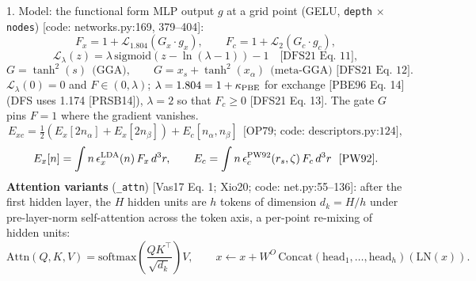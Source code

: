 
\begin{frame}{1. Model: the functional form}
  \small
  MLP output $g$ at a grid point (GELU, \texttt{depth} $\times$ \texttt{nodes}) [code: networks.py:169, 379--404]:
  \[
  F_x = 1 + \mathcal{L}_{1.804}\!\left(G_x \cdot g_x\right), \qquad
  F_c = 1 + \mathcal{L}_{2}\!\left(G_c \cdot g_c\right),
  \]
  \[
  \mathcal{L}_{\lambda}(z) = \lambda\,\mathrm{sigmoid}\!\left(z - \ln(\lambda - 1)\right) - 1 \quad \text{[DFS21 Eq. 11]},
  \]
  \[
  G = \tanh^2(s) \ \ \text{(GGA)}, \qquad G = x_s + \tanh^2(x_\alpha) \ \ \text{(meta-GGA) [DFS21 Eq. 12]}.
  \]
  $\mathcal{L}_\lambda(0) = 0$ and $F \in (0, \lambda)$; $\lambda = 1.804 = 1 + \kappa_{\rm PBE}$ for exchange [PBE96 Eq. 14] (DFS uses 1.174 [PRSB14]), $\lambda = 2$ so that $F_c \ge 0$ [DFS21 Eq. 13]. The gate $G$ pins $F = 1$ where the gradient vanishes.
  \[
  E_{xc} = \tfrac12\left(E_x[2 n_\alpha] + E_x[2 n_\beta]\right) + E_c[n_\alpha, n_\beta] \ \ \text{[OP79; code: descriptors.py:124]},
  \]
  \[
  E_x[n] = \int n\, \epsilon_x^{\rm LDA}(n)\, F_x\, d^3r, \qquad
  E_c = \int n\, \epsilon_c^{\rm PW92}(r_s, \zeta)\, F_c\, d^3r \ \ \text{[PW92]}.
  \]
  \textbf{Attention variants} (\texttt{\_attn}) [Vas17 Eq. 1; Xio20; code: net.py:55--136]: after the first hidden layer, the $H$ hidden units are $h$ tokens of dimension $d_k = H/h$ under pre-layer-norm self-attention across the token axis, a per-point re-mixing of hidden units:
  \[
  \mathrm{Attn}(Q, K, V) = \mathrm{softmax}\!\left(\frac{QK^{\top}}{\sqrt{d_k}}\right) V, \qquad
  x \leftarrow x + W^{O}\,\mathrm{Concat}(\mathrm{head}_1, \ldots, \mathrm{head}_h)(\mathrm{LN}(x)).
  \]
\end{frame}

